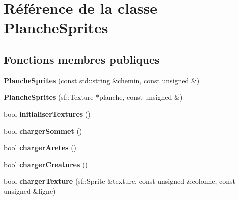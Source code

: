 \hypertarget{class_planche_sprites}{}\section{Référence de la classe Planche\+Sprites}
\label{class_planche_sprites}
\subsection*{Fonctions membres publiques}
\begin{DoxyCompactItemize}
\item 
\mbox{\label{class_planche_sprites_a607f2c2deab5351835b56ccbd1b62199}} 
{\bfseries Planche\+Sprites} (const std\+::string \&chemin, const unsigned \&)
\item 
\mbox{\label{class_planche_sprites_af4dcf16a3ca49f84b97f4a043cdf83ae}} 
{\bfseries Planche\+Sprites} (sf\+::\+Texture $\ast$planche, const unsigned \&)
\item 
\mbox{\label{class_planche_sprites_a3b82a9f478bf53104034bab27f39f19c}} 
bool {\bfseries initialiser\+Textures} ()
\item 
\mbox{\label{class_planche_sprites_a1fb8bb3923e7eca129279f078d135728}} 
bool {\bfseries charger\+Sommet} ()
\item 
\mbox{\label{class_planche_sprites_a55124e1100b82ab4d74de525238ac805}} 
bool {\bfseries charger\+Aretes} ()
\item 
\mbox{\label{class_planche_sprites_a7fb7a14d0a55a8c0842a8176a3f999cf}} 
bool {\bfseries charger\+Creatures} ()
\item 
\mbox{\label{class_planche_sprites_aad90c6a7d31fdd4be3021afb1ac3471e}} 
bool {\bfseries charger\+Texture} (sf\+::\+Sprite \&texture, const unsigned \&colonne, const unsigned \&ligne)
\end{DoxyCompactItemize}
